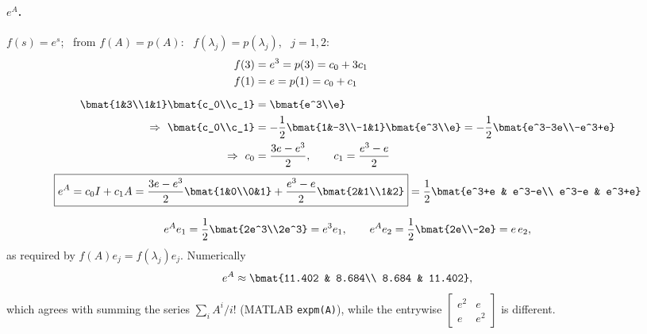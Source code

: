 \begin{example}
\paragraph{$e^A$.} $f(s) = e^s$; \ from $f(A) = p(A)$: \ $f(\lambda_j) = p(\lambda_j)$, \ $j = 1,2$:
\begin{align*}
f(3) &= e^3 = p(3) = c_0 + 3c_1\\
f(1) &= e = p(1) = c_0 + c_1\\[6pt]
\bmat{1&3\\1&1}\bmat{c_0\\c_1} &= \bmat{e^3\\e}\\
\Rightarrow\ \bmat{c_0\\c_1} &= -\frac12\bmat{1&-3\\-1&1}\bmat{e^3\\e}
= -\frac12\bmat{e^3-3e\\-e^3+e}\\
\Rightarrow\ c_0 &= \frac{3e-e^3}{2}, \qquad c_1 = \frac{e^3-e}{2}
\end{align*}
\[
\boxed{e^A = c_0I + c_1A = \frac{3e-e^3}{2}\bmat{1&0\\0&1} + \frac{e^3-e}{2}\bmat{2&1\\1&2}}
= \frac12\bmat{e^3+e & e^3-e\\ e^3-e & e^3+e}
\]
\begin{insight}[Check]
\[
e^A e_1 = \frac12\bmat{2e^3\\2e^3}=e^3e_1, \qquad e^Ae_2=\frac12\bmat{2e\\-2e}=e\,e_2,
\]
as required by $f(A)e_j=f(\lambda_j)e_j$. Numerically
\[
e^A\approx\bmat{11.402 & 8.684\\ 8.684 & 11.402},
\]
which agrees with summing the series $\sum_i A^i/i!$ (MATLAB \texttt{expm(A)}), while the entrywise $\left[\begin{smallmatrix}e^2&e\\e&e^2\end{smallmatrix}\right]$ is different.
\end{insight}


\end{example}
